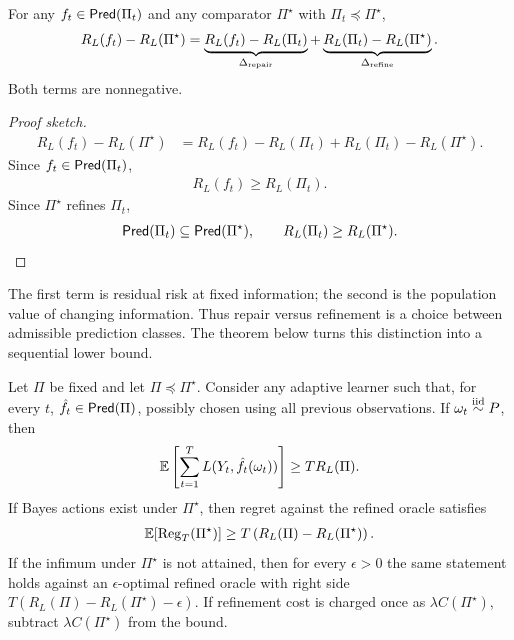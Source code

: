 \begin{theorem}
\label{thm:main-decomposition}
For any $f_t\in\mathsf{Pred}(\Pi_t)$ and any comparator $\Pi^\star$ with $\Pi_t\preceq\Pi^\star$,
\begin{align*}
R_L(f_t)-R_L(\Pi^\star)
=
\underbrace{R_L(f_t)-R_L(\Pi_t)}_{\Delta_{\rm repair}}
+
\underbrace{R_L(\Pi_t)-R_L(\Pi^\star)}_{\Delta_{\rm refine}}.
\end{align*}
Both terms are nonnegative.
\end{theorem}

\begin{proof}[Proof sketch]
\begin{align*}
R_L(f_t)-R_L(\Pi^\star)
&=
R_L(f_t)-R_L(\Pi_t)
+
R_L(\Pi_t)-R_L(\Pi^\star).
\end{align*}
Since $f_t\in\mathsf{Pred}(\Pi_t)$,
\begin{align*}
R_L(f_t)\ge R_L(\Pi_t).
\end{align*}
Since $\Pi^\star$ refines $\Pi_t$,
\begin{align*}
\mathsf{Pred}(\Pi_t)\subseteq \mathsf{Pred}(\Pi^\star),
\qquad
R_L(\Pi_t)\ge R_L(\Pi^\star).
\end{align*}
\end{proof}

The first term is residual risk at fixed information; the second is the population value of changing information. Thus repair versus refinement is a choice between admissible prediction classes. The theorem below turns this distinction into a sequential lower bound.

\begin{theorem}
\label{thm:main-repair-only}
Let $\Pi$ be fixed and let $\Pi\preceq\Pi^\star$. Consider any adaptive learner such that, for every $t$, $\hat f_t\in\mathsf{Pred}(\Pi)$, possibly chosen using all previous observations. If $\omega_t\stackrel{\rm iid}{\sim}P$, then
\begin{align*}
\operatorname*{\mathbb{E}}\left[\sum_{t=1}^T L(Y_t,\hat f_t(\omega_t))\right]
\ge
T R_L(\Pi).
\end{align*}
If Bayes actions exist under $\Pi^\star$, then regret against the refined oracle satisfies
\begin{align*}
\operatorname*{\mathbb{E}}[\mathrm{Reg}_T(\Pi^\star)]
\ge
T\left(R_L(\Pi)-R_L(\Pi^\star)\right).
\end{align*}
If the infimum under $\Pi^\star$ is not attained, then for every $\epsilon>0$ the same statement holds against an $\epsilon$-optimal refined oracle with right side $T(R_L(\Pi)-R_L(\Pi^\star)-\epsilon)$. If refinement cost is charged once as $\lambda C(\Pi^\star)$, subtract $\lambda C(\Pi^\star)$ from the bound.
\end{theorem}

